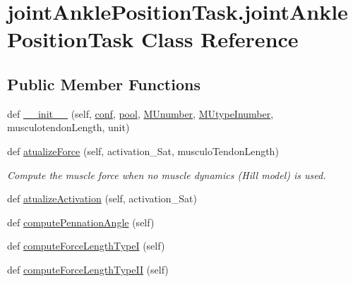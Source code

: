 \hypertarget{classjoint_ankle_position_task_1_1joint_ankle_position_task}{}\section{joint\+Ankle\+Position\+Task.\+joint\+Ankle\+Position\+Task Class Reference}
\label{classjoint_ankle_position_task_1_1joint_ankle_position_task}
\subsection*{Public Member Functions}
\begin{DoxyCompactItemize}
\item 
def \hyperlink{classjoint_ankle_position_task_1_1joint_ankle_position_task_ad07924061f34c215bc35a46ceea5cf6b}{\+\_\+\+\_\+init\+\_\+\+\_\+} (self, \hyperlink{classjoint_ankle_position_task_1_1joint_ankle_position_task_af106c2701a40941b1ad8cf82d6866cab}{conf}, \hyperlink{classjoint_ankle_position_task_1_1joint_ankle_position_task_aa8fb50eedd13b19ba31c9ddf38b8a32c}{pool}, \hyperlink{classjoint_ankle_position_task_1_1joint_ankle_position_task_ac1b0fcb61f40d743f316a80553cad3f4}{M\+Unumber}, \hyperlink{classjoint_ankle_position_task_1_1joint_ankle_position_task_a242bf5621b3cf0cd557f985a7b13bbc2}{M\+Utype\+Inumber}, musculotendon\+Length, unit)
\item 
def \hyperlink{classjoint_ankle_position_task_1_1joint_ankle_position_task_abe3c0546bf63fbf73815c59b5b86c6d5}{atualize\+Force} (self, activation\+\_\+\+Sat, musculo\+Tendon\+Length)
\begin{DoxyCompactList}\small\item\em Compute the muscle force when no muscle dynamics (Hill model) is used. \end{DoxyCompactList}\item 
def \hyperlink{classjoint_ankle_position_task_1_1joint_ankle_position_task_ae1a5c97c4bda835c542296071a4da624}{atualize\+Activation} (self, activation\+\_\+\+Sat)
\item 
def \hyperlink{classjoint_ankle_position_task_1_1joint_ankle_position_task_a9e82e35f0075aceaca2d4d4c8e1aaa72}{compute\+Pennation\+Angle} (self)
\item 
def \hyperlink{classjoint_ankle_position_task_1_1joint_ankle_position_task_a3af92ed0247e12d7dbb14ce9002f1f4b}{compute\+Force\+Length\+TypeI} (self)
\item 
def \hyperlink{classjoint_ankle_position_task_1_1joint_ankle_position_task_ad673d482ab048855070764c19714ea59}{compute\+Force\+Length\+Type\+II} (self)

\end{DoxyCompactItemize}
